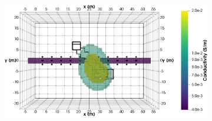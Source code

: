 \documentclass[preprint,authoryear,12pt]{elsarticle}
\begin{document}
\begin{figure}[htp]{}
\begin{center}
\begin{subfigure}{0.53\linewidth}
      \end{subfigure}
      \hspace{-4.0cm}
      \qquad
      \begin{subfigure}{0.53\linewidth}
         \label{fig:SynthMosaic2_StraightTunnel_4Linear_Top}
         \includegraphics[trim=0cm 0cm 0cm 0cm, clip=true,width=\linewidth]{./figures/Fig13d.png}
      \end{subfigure}
      \vspace{0.15cm}


\end{center}
\end{figure}
\end{document}
